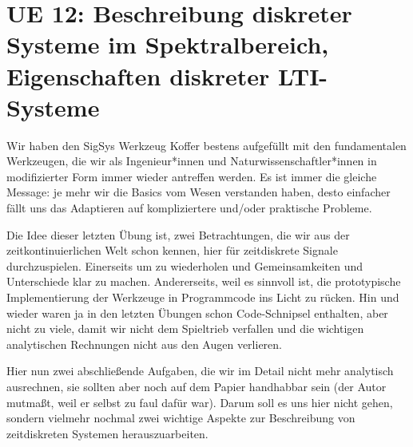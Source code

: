 \newpage
\section{UE 12: Beschreibung diskreter Systeme im Spektralbereich, Eigenschaften diskreter LTI-Systeme}

Wir haben den SigSys Werkzeug Koffer bestens aufgefüllt mit den fundamentalen
Werkzeugen, die wir als Ingenieur*innen und Naturwissenschaftler*innen
in modifizierter Form immer wieder antreffen werden.
Es ist immer die gleiche Message: je mehr wir
die Basics vom Wesen verstanden haben, desto einfacher fällt uns das Adaptieren auf
kompliziertere und/oder praktische Probleme.

Die Idee dieser letzten Übung ist, zwei Betrachtungen, die wir aus der
zeitkontinuierlichen Welt schon kennen, hier für zeitdiskrete Signale
durchzuspielen. Einerseits um zu wiederholen und Gemeinsamkeiten und Unterschiede
klar zu machen. Andererseits, weil es sinnvoll ist,
die prototypische Implementierung der Werkzeuge in Programmcode
ins Licht zu rücken.
Hin und wieder waren ja in den letzten Übungen schon Code-Schnipsel
enthalten, aber nicht zu viele, damit wir nicht dem Spieltrieb verfallen und
die wichtigen analytischen Rechnungen nicht aus den Augen verlieren.

Hier nun zwei abschließende Aufgaben, die wir im Detail nicht mehr analytisch
ausrechnen, sie sollten aber noch auf dem Papier
handhabbar sein (der Autor mutmaßt, weil er selbst zu faul dafür war).
Darum soll es uns hier nicht gehen, sondern vielmehr nochmal zwei wichtige
Aspekte zur Beschreibung von zeitdiskreten Systemen herauszuarbeiten.





\clearpage
